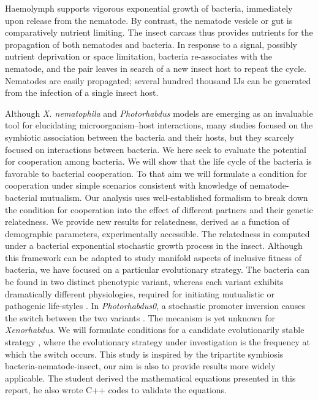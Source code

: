 \documentclass[10pt]{article}
\newcommand{\Xnema}{\textit{X. nematophila} }
\newcommand{\Photo}{\textit{Photorhabdus} }
\begin{document}
\begin{multicols}{2}
Haemolymph supports vigorous exponential growth \cite{Somvanshi2012} of bacteria, immediately upon release from the nematode.
By contrast, the nematode vesicle or gut is comparatively nutrient limiting.
The insect carcass thus provides nutrients for the propagation of both nematodes and bacteria.
In response to a signal, possibly nutrient deprivation or space limitation, bacteria re-associates with the nematode, and the pair leaves in search of a new insect host to repeat the cycle.
Nematodes are easily propagated; several hundred thousand IJs can be generated from the infection of a single insect host.

Although \Xnema and \Photo models are emerging as an invaluable tool for elucidating microorganism–host interactions,
many studies focused on the symbiotic association between the bacteria and their hosts, but they scarcely focused on interactions between bacteria.
We here seek to evaluate the potential for cooperation among bacteria.
We will show that the life cycle of the bacteria is favorable to bacterial cooperation.
To that aim we will formulate a condition for cooperation under simple scenarios consistent with knowledge of nematode-bacterial mutualism.
Our analysis uses well-established formalism to break down the condition for cooperation into the effect of different partners and their genetic relatedness.
We provide new results for relatedness, derived as a function of demographic parameters, experimentally accessible.
The relatedness in computed under a bacterial exponential stochastic growth process in the insect.
Although this framework can be adapted to study manifold aspects of inclusive fitness of bacteria, we have focused on a particular evolutionary strategy.
The bacteria can be found in two distinct phenotypic variant, whereas each variant exhibits dramatically different physiologies, required for initiating mutualistic or pathogenic life-styles \cite{Akhurst1982a,Forst1997}. 
In \textit{Photorhabdus0}, a stochastic promoter inversion causes the switch between the two variants \cite{Somvanshi2012}. The mecanism is yet unknown for \textit{Xenorhabdus}. 
We will formulate conditions for a candidate evolutionarily stable strategy \cite{lehmann2014fitness}, where the evolutionary strategy under investigation is the frequency at which the switch occurs.
This study is inspired by the tripartite symbiosis bacteria-nematode-insect, our aim is also to provide results more widely applicable.
The student derived the mathematical equations presented in this report, he also wrote C++ codes to validate the equations.

\end{multicols}
\end{document}
